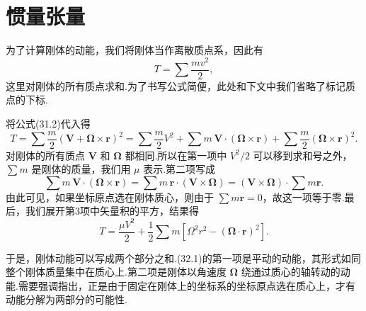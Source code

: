 \section{惯量张量}

为了计算刚体的动能，我们将刚体当作离散质点系，因此有
\begin{equation*}
  T=\sum\frac{mv^2}{2},
\end{equation*}
这里对刚体的所有质点求和.为了书写公式简便，此处和下文中我们省略了标记质点的下标.

将公式(31.2)代入得
\begin{equation*}
  T=\sum\frac{m}{2}\left(\boldsymbol{V}+\boldsymbol{\Omega}\times\boldsymbol{r}\right)^2
  =\sum\frac{m}{2}V^2+\sum m\,\boldsymbol{V}\cdot(\boldsymbol{\Omega}\times\boldsymbol{r})
  +\sum\frac{m}{2}\left(\boldsymbol{\Omega}\times\boldsymbol{r}\right)^2.
\end{equation*}
对刚体的所有质点 $\boldsymbol{V}$ 和 $\boldsymbol{\Omega}$ 都相同.所以在第一项中 $V^2/2$ 可以移到求和号之外，$\sum m$ 是刚体的质量，我们用 $\mu$ 表示.第二项写成
\begin{equation*}
  \sum m\,\boldsymbol{V}\cdot(\boldsymbol{\Omega}\times\boldsymbol{r})
  =\sum m\,\boldsymbol{r}\cdot(\boldsymbol{V}\times\boldsymbol{\Omega})
  =(\boldsymbol{V}\times\boldsymbol{\Omega})\cdot\sum m\boldsymbol{r}.
\end{equation*}
由此可见，如果坐标原点选在刚体质心，则由于 $\sum m\boldsymbol{r}=0$，故这一项等于零.最后，我们展开第3项中矢量积的平方，结果得
\begin{equation}
  T=\frac{\mu V^2}{2}
  +\frac{1}{2}\sum m\left[\Omega^2r^2-(\boldsymbol{\Omega}\cdot\boldsymbol{r})^2\right].
\end{equation}

于是，刚体动能可以写成两个部分之和.(32.1)的第一项是平动的动能，其形式如同整个刚体质量集中在质心上.第二项是刚体以角速度 $\boldsymbol{\Omega}$ 绕通过质心的轴转动的动能.需要强调指出，正是由于固定在刚体上的坐标系的坐标原点选在质心上，才有动能分解为两部分的可能性.

